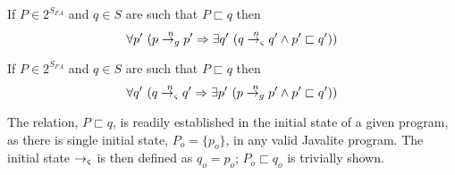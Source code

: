 \begin{corollary}
If $P \in 2^{S_\mathit{FA}}$ and $q \in S$ are such that $P \sqsubset q$ then
$$
\forall p^\prime\ (p \stackrel{n}{\rightarrow_{g}} p^\prime \Rightarrow \exists q^\prime\ (q \stackrel{n}{\rightarrow_{\varsigma}} q^\prime \wedge p^\prime \sqsubset q^\prime))
$$
\end{corollary}

\begin{corollary}
If $P \in 2^{S_\mathit{FA}}$ and $q \in S$ are such that $P \sqsubset q$ then
$$
\forall q^\prime\ (q \stackrel{n}{\rightarrow_{\varsigma}} q^\prime \Rightarrow \exists p^\prime\ (p \stackrel{n}{\rightarrow_{g}} p^\prime \wedge p^\prime \sqsubset q^\prime))
$$
\end{corollary}

The relation, $P \sqsubset q$, is readily established in the initial
state of a given program, as there is single initial state, $P_o =
\{p_o\}$, in any valid Javalite program. The initial state $\rightarrow_{\varsigma}$ is
then defined as $q_o = p_o$; $P_o \sqsubset q_o$ is trivially shown.
